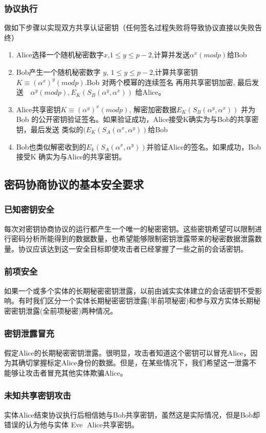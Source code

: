 \documentclass[11pt,a4paper]{article}
\begin{document}
\subsubsection{协议执行} 做如下步骤以实现双方共享认证密钥（任何签名过程失败将导致协议直接以失败告终）
\begin{enumerate}
\item Alice选择一个随机秘密数字$x$,$1\le y \le p-2$,计算并发送$\alpha^x(mod p)$给Bob

\item Bob产生一个随机秘密数字 $y$, $1\le y \le p-2$,计算共享密钥$K\equiv (\alpha^x)^y(mod p)$.Bob 对两个模幂的连续签名 再用共享密钥加密, 最后发送　$\alpha^y(mod p), E_K(S_B(\alpha^y, \alpha^x))$ 给Alice。
\item Alice共享密钥$K\equiv (\alpha^y)^x(mod p)$, 解密加密数据$E_K(S_B(\alpha^y, \alpha^x))$ 并为Bob 的公开密钥验证签名。如果验证成功，Alice接受K确实为与Bob的共享密钥，最后发送 类似的$(E_K(S_A(\alpha^x, \alpha^y))$给Bob
\item Bob也类似解密收到的$E_k(S_A(\alpha^x, \alpha^y))$并验证Alice的签名。如果成功，Bob接受K 确实为与Alice的共享密钥。
\end{enumerate}
\subsection{密码协商协议的基本安全要求}
\subsubsection{已知密钥安全} 每次对密钥协商协议的运行都产生一个唯一的秘密密钥。这些密钥希望可以限制进行密码分析所能得到的数据数量，也希望能够限制密钥泄露带来的秘密数据泄露数量。协议应该达到这一安全目标即使攻击者已经掌握了一些之前的会话密钥。
\subsubsection{前项安全} 如果一个或多个实体的长期秘密密钥泄露，以前由诚实实体建立的会话密钥不受影响。有时我们区分一个实体长期秘密密钥泄露(半前项秘密)和参与双方实体长期秘密密钥泄露(全前项秘密)两种情况。
\subsubsection{密钥泄露冒充} 假定Alice的长期秘密密钥泄露。很明显，攻击者知道这个密钥可以冒充Alice，因为其确切掌握标定Alice身份的数据。但是，在某些情况下，我们希望这一泄露不能够让攻击者冒充其他实体欺骗Alice。
\subsubsection{未知共享密钥攻击} 实体Alice结束协议执行后相信她与Bob共享密钥，虽然这是实际情况，但是Bob却错误的认为他与实体 Eve Alice共享密钥。
\end{document}
